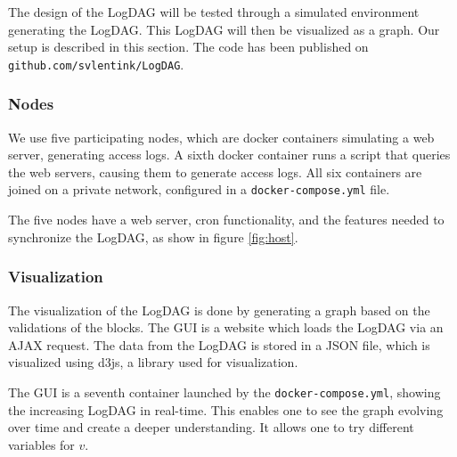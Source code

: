 The design of the LogDAG will be tested through
a simulated environment
generating the LogDAG.
This LogDAG will then be visualized as a graph.
Our setup is described in this section.
The code has been published on \texttt{github.com/svlentink/LogDAG}.

\subsubsection{Nodes}
We use five participating nodes,
which are docker containers simulating a web server,
generating access logs.
A sixth docker container runs a script that queries
the web servers, causing them to generate access logs.
All six containers are joined on a private network,
configured in a \texttt{docker-compose.yml} file.

The five nodes have a web server,
cron functionality,
and the features needed to synchronize the LogDAG,
as show in figure \ref{fig:host}.

\subsubsection{Visualization}
\label{method_visualization}

The visualization of the LogDAG is done by generating a graph
based on the validations of the blocks.
The GUI is a website which loads the LogDAG via an AJAX request.
The data from the LogDAG is stored in a JSON file,
which is visualized using d3js,
a library used for visualization.

The GUI is a seventh container launched by the
\texttt{docker-compose.yml},
showing the increasing LogDAG in real-time.
This enables one to see the graph evolving over time
and create a deeper understanding.
It allows one to try different variables for $v$.
